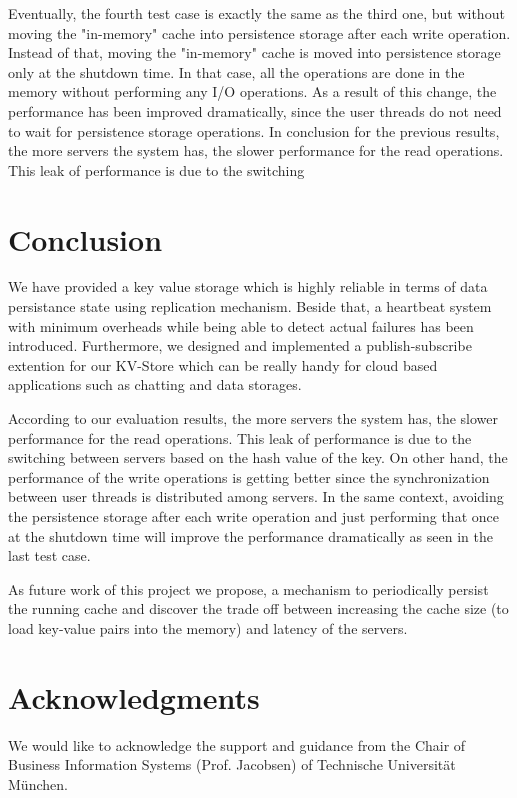 \documentclass{sig-alternate}
\begin{document}
Eventually, the fourth test case is exactly the same as the third one, but without moving the "in-memory" cache into persistence storage after each write operation. Instead of that, moving the "in-memory" cache is moved into persistence storage only at the shutdown time. In that case, all the operations are done in the memory without performing any I/O operations. As a result of this change, the performance has been improved dramatically, since the user threads do not need to wait for persistence storage operations.
In conclusion for the previous results, the more servers the system has, the slower performance for the read operations. This leak of performance is due to the switching 
\section{Conclusion}
We have provided a key value storage which is highly reliable in terms of data persistance state using replication mechanism. Beside that, a heartbeat system with minimum overheads while being able to detect actual failures has been introduced. Furthermore, we designed and implemented a publish-subscribe extention for our KV-Store which can be really handy for cloud based applications such as chatting and data storages.

According to our evaluation results, the more servers the system has, the slower performance for the read operations. This leak of performance is due to the switching between servers based on the hash value of the key. On other hand, the performance of the write operations is getting better since the synchronization between user threads is distributed among servers. In the same context, avoiding the persistence storage after each write operation and just performing that once at the shutdown time will improve the performance dramatically as seen in the last test case.

As future work of this project we propose, a mechanism to periodically persist the running cache and discover the trade off between increasing the cache size (to load key-value pairs into the memory) and latency of the servers. 

\section{Acknowledgments}
We would like to acknowledge the support and guidance from the  Chair of Business Information Systems (Prof. Jacobsen) of Technische Universit{\"a}t M{\"u}nchen.
%

%
%

\end{document}
